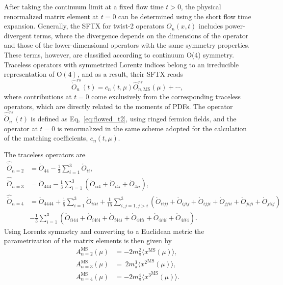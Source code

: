 \documentclass[10pt]{article}
\begin{document}
After taking the continuum limit at a fixed flow time $t > 0$, the physical renormalized matrix element at $t = 0$ can be determined using the short flow time expansion. Generally, the SFTX for twist-2 operators $O_n(x,t)$ includes power-divergent terms, where the divergence depends on the dimensions of the operator and those of the lower-dimensional operators with the same symmetry properties. These terms, however, are classified according to continuum O($4$) symmetry. Traceless operators with symmetrized Lorentz indices belong to an irreducible representation of $\mathrm{O}(4)$, and as a result, their SFTX reads
\begin{equation}
\widehat{\mathring{O}}_n^{rs}(t) = c_n(t,\mu)\widehat{O}_{n,\mathrm{MS}}^{rs}(\mu) + \cdots,
\label{eq:sftx}
\end{equation}
where contributions at $t = 0$ come exclusively from the corresponding traceless operators, which are directly related to the moments of PDFs. The operator $\widehat{\mathring{O}}_n^{rs}(t)$ is defined as Eq,~\eqref{eq:flowed_t2}, using ringed fermion fields, and the operator at $t=0$ is renormalized in the same scheme adopted for the calculation of the matching coefficients, $c_n(t,\mu)$.

The traceless operators are
\begin{equation}
\begin{aligned}
\widehat{\mathring{O}}_{n=2}&=\mathring{O}_{44}-\frac{1}{3}\sum_{i=1}^3\mathring{O}_{ii},\\
\widehat{\mathring{O}}_{n=3} &= \mathring{O}_{444}-\frac{1}{3}\sum_{i=1}^3(\mathring{O}_{ii4}+\mathring{O}_{i4i}+\mathring{O}_{4ii}), \\
\widehat{\mathring{O}}_{n=4} &= \mathring{O}_{4444}+\frac{1}{5}\sum_{i=1}^3 \mathring{O}_{iiii}+\frac{1}{15}\sum_{i,j=1,j>i}^3 (\mathring{O}_{iijj}+\mathring{O}_{ijij}+\mathring{O}_{ijji}+\mathring{O}_{jjii}+\mathring{O}_{jiji}+\mathring{O}_{jiij}) \\
&-\frac{1}{3}\sum_{i=1}^3 (\mathring{O}_{ii44}+\mathring{O}_{i4i4}+\mathring{O}_{i44i}+\mathring{O}_{44ii}+\mathring{O}_{4i4i}+\mathring{O}_{4ii4}).
\end{aligned}
\label{eq:O4444} 
\end{equation}
Using Lorentz symmetry and converting to a Euclidean metric the parametrization of the matrix elements is then given by 
\begin{equation}
\begin{aligned}
A^{\mathrm{MS}}_{n=2}(\mu) & =-2 m_\pi^2 \langle {x}^{\mathrm{MS}}(\mu) \rangle, \\ 
A^{\mathrm{MS}}_{n=3}(\mu) & =~2 m_\pi^3 \langle {x^2}^{\mathrm{MS}}(\mu) \rangle, \\
A^{\mathrm{MS}}_{n=4}(\mu) & =- 2 m_\pi^4 \langle {x^3}^{\mathrm{MS}}(\mu) \rangle.
\end{aligned}
\end{equation}
\end{document}
